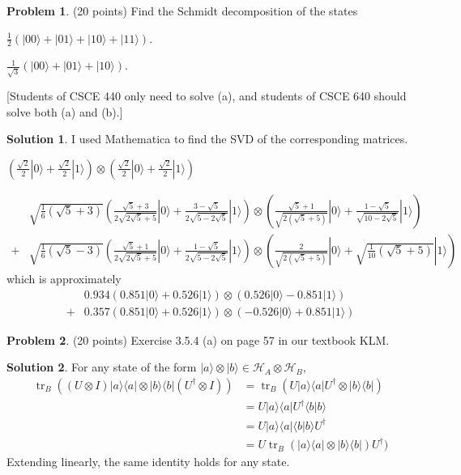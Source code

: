 \documentclass{article}
\theoremstyle{definition}
\newtheorem{problem}{Problem}
\newtheorem*{solution}{Solution}
\newcommand{\ket}[1]{|#1\rangle}
\newcommand{\bra}[1]{\langle#1|}
\DeclareMathOperator{\tr}{tr}
\begin{document}
\begin{problem}{(20 points)}
Find the Schmidt decomposition of the states 
\begin{compactenum}[(a)]
\item $ \frac{1}{2}\left( \ket{00} + \ket{01} + \ket{10} + \ket{11}
  \right)$.
\item $ \frac{1}{\sqrt{3}}\left( \ket{00} + \ket{01} + \ket{10}
  \right)$.
\end{compactenum}
[Students of CSCE 440 only need to solve (a), and students of CSCE 640
should solve both (a) and (b).] 
\end{problem}
\begin{solution}
I used Mathematica to find the SVD of the corresponding matrices.
\begin{compactenum}[(a)]
\item 
$(\frac{\sqrt{2}}{2} \ket{0} + \frac{\sqrt{2}}{2} \ket{1}) \otimes (\frac{\sqrt{2}}{2} \ket{0} + \frac{\sqrt{2}}{2} \ket{1})$
\item 
\begin{align*}
&  \sqrt{\frac{1}{6} \left(\sqrt{5}+3\right)} \left(\frac{\sqrt{5}+3}{2 \sqrt{2 \sqrt{5}+5}} \ket{0} + \frac{3-\sqrt{5}}{2 \sqrt{5-2 \sqrt{5}}} \ket{1}\right) 
       \otimes \left(\frac{\sqrt{5}+1}{\sqrt{2 \left(\sqrt{5}+5\right)}}\ket{0} + \frac{1-\sqrt{5}}{\sqrt{10-2 \sqrt{5}}} \ket{1}\right) 
\\ +  &  \sqrt{\frac{1}{6} \left(\sqrt{5}-3\right)} \left(\frac{\sqrt{5}+1}{2 \sqrt{2 \sqrt{5}+5}} \ket{0} + \frac{1-\sqrt{5}}{2 \sqrt{5-2 \sqrt{5}}} \ket{1} \right) 
       \otimes \left(\frac{2}{\sqrt{2 \left(\sqrt{5}+5\right)}}\ket{0} + \sqrt{\frac{1}{10} \left(\sqrt{5}+5\right)} \ket{1}\right)  
\end{align*}
which is approximately
\begin{align*}
& 0.934(0.851 \ket{0} + 0.526 \ket{1}) \otimes (0.526 \ket{0} -0.851 \ket{1})
\\ + &  0.357(0.851 \ket{0} + 0.526 \ket{1}) \otimes (-0.526 \ket{0} + 0.851 \ket{1})
\end{align*}
\end{compactenum}
\end{solution}

\begin{problem}{(20 points)}
Exercise 3.5.4 (a) on page 57 in our textbook KLM. 
\end{problem}
\begin{solution}
For any state of the form $\ket{a} \otimes \ket{b} \in \mathcal{H}_A \otimes \mathcal{H}_B$,
\begin{align*}
\tr_B((U \otimes I) \ket{a} \bra{a} \otimes \ket{b} \bra{b} (U^\dagger \otimes I)) 
& = \tr_B(U \ket{a} \bra{a} U^\dagger \otimes \ket{b} \bra{b}) 
\\  & = U \ket{a} \bra{a} U^\dagger \langle b | b \rangle 
\\  & = U \ket{a} \bra{a} \langle b | b \rangle  U^\dagger
\\  & = U \tr_B(\ket{a} \bra{a} \otimes \ket{b} \bra{b})   U^\dagger)  
\end{align*}
Extending linearly, the same identity holds for any state.
\end{solution}
\end{document}
